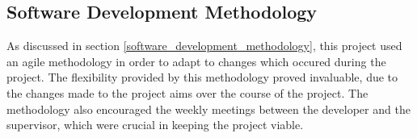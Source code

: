 







%






\subsection{Software Development Methodology}
As discussed in section \ref{software_development_methodology}, this project used an agile methodology in order to adapt to changes which occured during the project. The flexibility provided by this methodology proved invaluable, due to the changes made to the project aims over the course of the project.
The methodology also encouraged the weekly meetings between the developer and the supervisor, which were crucial in keeping the project viable.



